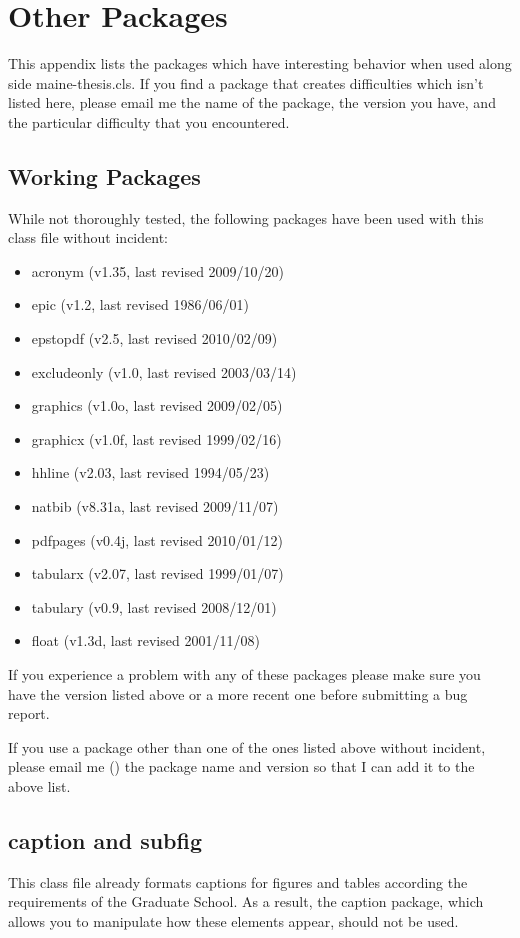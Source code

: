\chapter{Other Packages}
\label{package}
This appendix lists the packages which have interesting behavior when used along side maine-thesis.cls.  If you find a package that creates difficulties which isn't listed here, please email me the name of the package, the version you have, and the particular difficulty that you encountered.

\section{Working Packages}
While not thoroughly tested, the following packages have been used with this class file without incident:
\begin{itemize}
\item{acronym (v1.35, last revised 2009/10/20)}
\item{epic (v1.2, last revised 1986/06/01)}
\item{epstopdf (v2.5, last revised 2010/02/09)}
\item{excludeonly (v1.0, last revised 2003/03/14)}
\item{graphics (v1.0o, last revised 2009/02/05)}
\item{graphicx (v1.0f, last revised 1999/02/16)}
\item{hhline (v2.03, last revised 1994/05/23)}
\item{natbib (v8.31a, last revised 2009/11/07)}
\item{pdfpages (v0.4j, last revised 2010/01/12)}
\item{tabularx (v2.07, last revised 1999/01/07)}
\item{tabulary (v0.9, last revised 2008/12/01)}
\item{float (v1.3d, last revised 2001/11/08)}
\end{itemize}
If you experience a problem with any of these packages please make sure you have the version listed above or a more recent one before submitting a bug report.

If you use a package other than one of the ones listed above without incident, please email me (\email) the package name and version so that I can add it to the above list.

\section{caption and subfig}
This class file already formats captions for figures and tables according the requirements of the Graduate School.  As a result, the caption package, which allows you to manipulate how these elements appear, should not be used.

